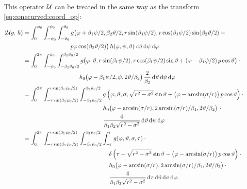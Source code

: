 \documentclass{amsart}
\renewcommand*{\phi}{\varphi}
\begin{document}
%
This operator ${\mathcal{U}}$ can be treated in the same way as the transform \eqref{eq:conecurved:coord_op}:
%
\begin{align*}
 \INNER{\OPU g}{h}
 &= \int_0^{\phi_0} \int_{-\psi_0}^{\psi_0} \int_{-\vartheta_0}^{\vartheta_0} g\big( \phi + \beta_1\psi/2, \beta_2\vartheta/2, 
 r\sin(\beta_1\psi/2), r \cos(\beta_1\psi/2) \sin(\beta_2\vartheta/2) + \phantom{x} \\
 &\hspace{80pt} p \phi \cos(\beta_2\vartheta/2) \big)\, h(\phi, \psi, \vartheta)\, \D\vartheta\, \D\psi\, \D\phi \\
 &= \int_0^{2\pi} \int_{-\psi_0}^{\psi_0} \int_{-\beta_2\vartheta_0/2}^{\beta_2\vartheta_0/2} g\big( \phi, \vartheta, 
 r\sin(\beta_1\psi/2), r \cos(\beta_1\psi/2) \sin\vartheta + (\phi - \beta_1\psi/2)\, p \cos\vartheta \big) \cdot \phantom{x} \\
 &\hspace{95pt} h_0\big( \phi - \beta_1\psi/2, \psi, 2\vartheta/\beta_2 \big)\, 
 \frac{2}{\beta_2}\, \D\vartheta\, \D\psi\, \D\phi \\
 &= \int_0^{2\pi} \int_{-r\sin(\beta_1\psi_0/2)}^{r\sin(\beta_1\psi_0/2)} \int_{-\beta_2\vartheta_0/2}^{\beta_2\vartheta_0/2}
 g\left( \phi, \vartheta, \sigma, \sqrt{r^2 - \sigma^2} \sin\vartheta + \big(\phi - \arcsin(\sigma/r)\big)\, p \cos\vartheta \right) \cdot 
 \phantom{x} \\
 &\hspace{135pt} h_0\big( \phi - \arcsin(\sigma/r), 2\arcsin(\sigma/r)/\beta_1, 2\vartheta/\beta_2 \big)\, \cdot \phantom{x} \\
 &\hspace{135pt} \frac{4}{\beta_1\beta_2\sqrt{r^2 - \sigma^2}}\, \D\vartheta\, \D\psi\, \D\phi \\
 &= \int_0^{2\pi} \int_{-r\sin(\beta_1\psi_0/2)}^{r\sin(\beta_1\psi_0/2)} \int_{-\beta_2\vartheta_0/2}^{\beta_2\vartheta_0/2} \int_{-r}^r
 g(\phi, \vartheta, \sigma, \tau) \cdot \phantom{x} \\
 &\hspace{145pt} \delta\left( \tau - \sqrt{r^2 - \sigma^2} \sin\vartheta - \big(\phi - \arcsin(\sigma/r)\big)\, p \cos\vartheta \right) 
 \cdot \phantom{x} \\
 &\hspace{145pt} h_0\big( \phi - \arcsin(\sigma/r), 2\arcsin(\sigma/r)/\beta_1, 2\vartheta/\beta_2 \big) \cdot \phantom{x} \\
 &\hspace{145pt} \frac{4}{\beta_1\beta_2\sqrt{r^2 - \sigma^2}}\, \D\tau\, \D\vartheta\, \D\sigma\, \D\phi.
\end{align*}
\end{document}
